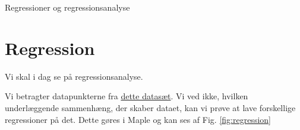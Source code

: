 
\begin{center}
\Huge
Regressioner og regressionsanalyse
\end{center}
\section*{Regression}
Vi skal i dag se på regressionsanalyse.

\begin{exa}
Vi betragter datapunkterne fra \href{https://github.com/ChristianJLex/TeachingNotes/raw/master/2023-2024/Data og lign/regression_eksempel.xlsx}{\color{blue!60} dette datasæt}.
Vi ved ikke, hvilken underlæggende sammenhæng, der skaber dataet, kan vi prøve at lave forskellige regressioner på det. Dette gøres i Maple og kan ses af Fig. \ref{fig:regression}


\end{exa}
